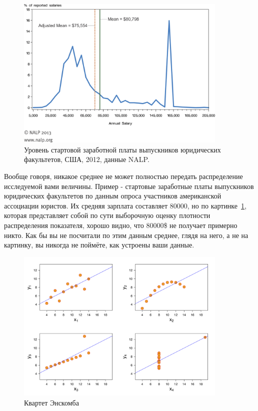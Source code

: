 \begin{figure}[!htb]\center
\includegraphics[width=0.9\textwidth]{lectures/lect1/src/nalp2012.png}
\caption{Уровень стартовой заработной платы выпускников юридических факультетов, США, 2012, данные NALP.}
\label{fg:lect1:fig-8}
\end{figure}
Вообще говоря, никакое среднее не может полностью передать распределение исследуемой вами величины. Пример - стартовые заработные платы выпускников юридических факультетов по данным опроса участников американской ассоциации юристов. Их средняя зарплата составляет 80000, но по картинке~\ref{fg:lect1:fig-8}, которая представляет собой по сути выборочную оценку плотности распределения показателя, хорошо видно, что 80000\$ не получает примерно никто. Как бы вы не посчитали по этим данным среднее, глядя на него, а не на картинку, вы никогда не поймёте, как устроены ваши данные.

\begin{figure}[!htb]\center
\includegraphics[width=0.9\textwidth]{lectures/lect1/src/Anscombe's_quartet.png}
\caption{Квартет Энскомба}
\label{fg:lect1:fig-9}
\end{figure}

